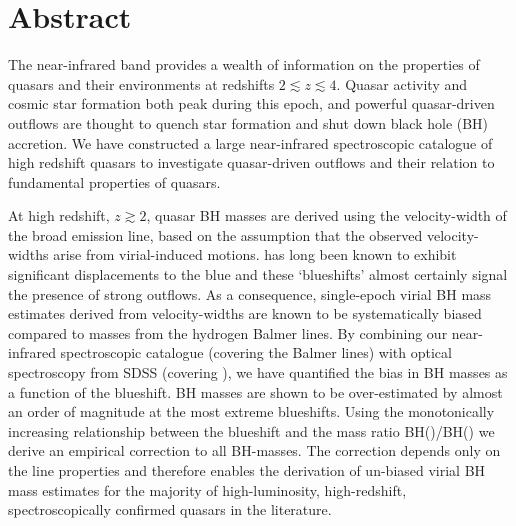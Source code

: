 \begingroup
\let\clearpage\relax
\let\cleardoublepage\relax
\let\cleardoublepage\relax

\chapter*{Abstract}

The near-infrared band provides a wealth of information on the properties of quasars and their environments at redshifts $2 \lesssim z \lesssim 4$. 
Quasar activity and cosmic star formation both peak during this epoch, and powerful quasar-driven outflows are thought to quench star formation and shut down black hole (BH) accretion. 
We have constructed a large near-infrared spectroscopic catalogue of high redshift quasars to investigate quasar-driven outflows and their relation to fundamental properties of quasars. 

At high redshift, $z \gtrsim 2$, quasar BH masses are derived using the velocity-width of the  broad emission line, based on the assumption that the observed velocity-widths arise from virial-induced motions.  
 has long been known to exhibit significant displacements to the blue and these `blueshifts' almost certainly signal the presence of strong outflows.
As a consequence, single-epoch virial BH mass estimates derived from  velocity-widths are known to be systematically biased compared to masses from the hydrogen Balmer lines.
By combining our near-infrared spectroscopic catalogue (covering the Balmer lines) with optical spectroscopy from SDSS (covering ), we have quantified the bias in  BH masses as a function of the  blueshift. 
 BH masses are shown to be over-estimated by almost an order of magnitude at the most extreme blueshifts.
Using the monotonically increasing relationship between the  blueshift and the mass ratio BH()/BH(\hans) we derive an empirical correction to all  BH-masses.
The correction depends only on the  line properties and therefore enables the derivation of un-biased virial BH mass estimates for the majority of high-luminosity, high-redshift, spectroscopically confirmed quasars in the literature. 

